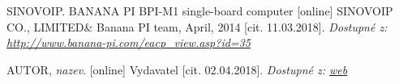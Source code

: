 \begin{thebibliography}{99}
	 SINOVOIP. BANANA PI BPI-M1 single-board computer [online] SINOVOIP CO., LIMITED\& Banana PI team, April, 2014  [cit. 11.03.2018]. 
		\textit{Dostupné z: \url{http://www.banana-pi.com/eacp_view.asp?id=35}}
 
 \bibitem{} AUTOR, \textit{nazev}. [online] Vydavatel [cit. 02.04.2018]. 
 	\textit{Dostupné z: \url{web}}
\end{thebibliography}
